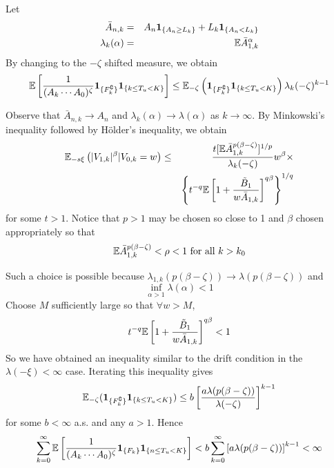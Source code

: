 \documentclass{beamer}
\begin{document}
\begin{frame}
  Let
  \begin{eqnarray*}
    \bar A_{n,k} &=& A_{n} \mathbf{1}_{\{A_n \geq L_k\}} + L_k \mathbf{1}_{\{A_n < L_k\}} \\
    \lambda_k(\alpha) &=& \mathbb{E} \bar A_{1,k}^\alpha
  \end{eqnarray*}
  By changing to the $-\zeta$ shifted measure, we obtain
  \[
  \mathbb{E} \left[
  {
    1\over
    (A_k \cdots A_0)^\zeta
  } \mathbf{1}_{\{F_k^\complement\}} \mathbf{1}_{\{k \leq T_u < K\}} \right]
  \leq \mathbb{E}_{-\zeta}\left(\mathbf{1}_{\{F_k^\complement\}} \mathbf{1}_{\{k \leq T_u < K\}}\right)
  \lambda_k(-\zeta)^{k-1} 
  \]
\end{frame}

\begin{frame}
  Observe that $\bar A_{n,k} \to A_n$ and $\lambda_k(\alpha) \to
  \lambda(\alpha)$ as $k \to \infty$. By Minkowski's inequality
  followed by H\"older's inequality, we obtain
  \begin{eqnarray*}
    \mathbb{E}_{-s\xi} \left( |V_{1,k}|^\beta | V_{0,k} = w\right) &\leq& {
    t [\mathbb{E} \bar A_{1,k}^{p(\beta - \zeta)}]^{1/p}
    \over
    \lambda_k(-\zeta)
  } w^\beta \times \\
  && \left\{
    t^{-q} \mathbb{E} \left[
      1 + {
        \tilde B_1
        \over
        w \bar A_{1,k}
      }
    \right]^{q\beta}
  \right\}^{1/q}
  \end{eqnarray*}
  for some $t > 1$. Notice that $p > 1$ may be chosen so close to 1
  and $\beta$ chosen appropriately so that
  \[
  \mathbb{E} \bar A_{1,k}^{p(\beta - \zeta)} < \rho < 1 \text{ for all } k > k_0
  \]
\end{frame}

\begin{frame}
  Such a choice is possible because $\lambda_{1,k}(p(\beta - \zeta))
  \to \lambda(p(\beta - \zeta))$ and
  \[
  \inf_{\alpha > 1} \lambda(\alpha) < 1
  \]
  Choose $M$ sufficiently large so that $\forall w > M$,
  \[
    t^{-q} \mathbb{E} \left[
      1 + {
        \tilde B_1
        \over
        w \bar A_{1,k}
      }
    \right]^{q\beta} < 1
  \]
  So we have obtained an inequality similar to the drift condition in
  the $\lambda(-\xi) < \infty$ case.  Iterating this inequality gives
  \[
  \mathbb{E}_{-\zeta}(\mathbf{1}_{\{F_k^\complement\}} \mathbf{1}_{\{k \leq T_u < K\}}) \leq b \left[
  {
    a \lambda (p(\beta - \zeta))
    \over
    \lambda(-\zeta)
  }
\right]^{k-1}
  \]
  for some $b < \infty$ a.s. and any $a > 1$. Hence
  \[
  \sum_{k=0}^\infty \mathbb{E} \left[
    {
      1 \over
      (A_k \cdots A_0)^\zeta
    }  \mathbf{1}_{\{F_k\}}  \mathbf{1}_{\{n \leq T_u < K\}}
  \right]
  <
  b \sum_{k=0}^\infty \left[
    {
      a \lambda (p(\beta - \zeta))
    }
  \right]^{k-1} < \infty
  \]
\end{frame}
\end{document}
